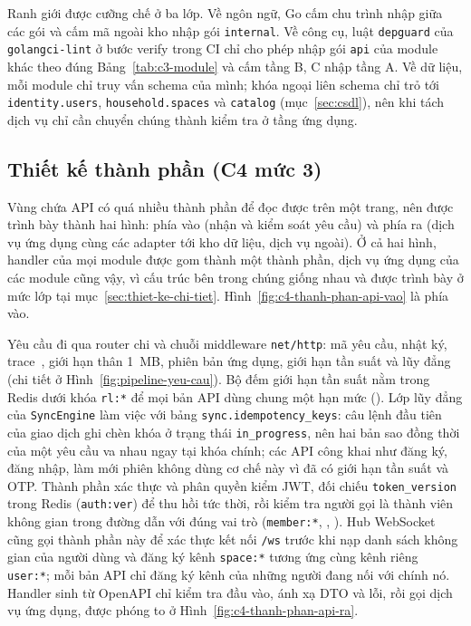 Ranh giới được cưỡng chế ở ba lớp. Về ngôn ngữ, Go cấm chu trình nhập giữa các gói và cấm mã ngoài kho nhập gói \texttt{internal}. Về công cụ, luật \texttt{depguard} của \texttt{golangci-lint} ở bước verify trong CI chỉ cho phép nhập gói \texttt{api} của module khác theo đúng Bảng~\ref{tab:c3-module} và cấm tầng B, C nhập tầng A. Về dữ liệu, mỗi module chỉ truy vấn schema của mình; khóa ngoại liên schema chỉ trỏ tới \texttt{identity.users}, \texttt{household.spaces} và \texttt{catalog} (mục~\ref{sec:csdl}), nên khi tách dịch vụ chỉ cần chuyển chúng thành kiểm tra ở tầng ứng dụng.

\subsection{Thiết kế thành phần (C4 mức 3)}\label{ssec:thiet-ke-thanh-phan}

Vùng chứa API có quá nhiều thành phần để đọc được trên một trang, nên được trình bày thành hai hình: phía vào (nhận và kiểm soát yêu cầu) và phía ra (dịch vụ ứng dụng cùng các adapter tới kho dữ liệu, dịch vụ ngoài). Ở cả hai hình, handler của mọi module được gom thành một thành phần, dịch vụ ứng dụng của các module cũng vậy, vì cấu trúc bên trong chúng giống nhau và được trình bày ở mức lớp tại mục~\ref{sec:thiet-ke-chi-tiet}. Hình~\ref{fig:c4-thanh-phan-api-vao} là phía vào.


Yêu cầu đi qua router chi và chuỗi middleware \texttt{net/http}: mã yêu cầu, nhật ký, trace~\cite{opentelemetry}, giới hạn thân 1~MB, phiên bản ứng dụng, giới hạn tần suất và lũy đẳng (chi tiết ở Hình~\ref{fig:pipeline-yeu-cau}). Bộ đếm giới hạn tần suất nằm trong Redis dưới khóa \texttt{rl:*} để mọi bản API dùng chung một hạn mức (). Lớp lũy đẳng của \texttt{SyncEngine} làm việc với bảng \texttt{sync.idempotency\_keys}: câu lệnh đầu tiên của giao dịch ghi chèn khóa ở trạng thái \texttt{in\_progress}, nên hai bản sao đồng thời của một yêu cầu va nhau ngay tại khóa chính; các API công khai như đăng ký, đăng nhập, làm mới phiên không dùng cơ chế này vì đã có giới hạn tần suất và OTP. Thành phần xác thực và phân quyền kiểm JWT, đối chiếu \texttt{token\_version} trong Redis (\texttt{auth:ver}) để thu hồi tức thời, rồi kiểm tra người gọi là thành viên không gian trong đường dẫn với đúng vai trò (\texttt{member:*}, , ). Hub WebSocket cũng gọi thành phần này để xác thực kết nối \texttt{/ws} trước khi nạp danh sách không gian của người dùng và đăng ký kênh \texttt{space:*} tương ứng cùng kênh riêng \texttt{user:*}; mỗi bản API chỉ đăng ký kênh của những người đang nối với chính nó. Handler sinh từ OpenAPI chỉ kiểm tra đầu vào, ánh xạ DTO và lỗi, rồi gọi dịch vụ ứng dụng, được phóng to ở Hình~\ref{fig:c4-thanh-phan-api-ra}.

